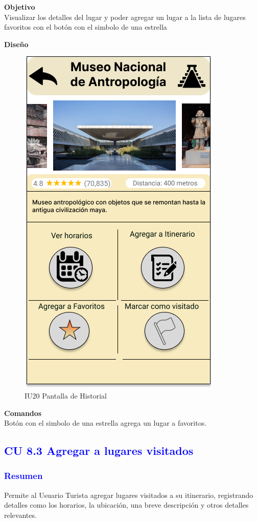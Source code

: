 \textbf{Objetivo} \\
Visualizar los detalles del lugar y poder agregar un lugar a la lista de lugares favoritos con el botón con el simbolo de una estrella

\textbf{Diseño}

    \begin{figure}[h]
        
            \centering
            \includegraphics[width=.4\linewidth]{Pantallas Prototipo3/IU41-Detalles del lugar.jpg}
            \caption{IU20 Pantalla de Historial}
    
    \end{figure}
\pagebreak
\textbf{Comandos} \\
Botón con el simbolo de una estrella agrega un lugar a favoritos.


\vspace{20cm}
\subsection{\textcolor{blue}{CU 8.3 Agregar a lugares visitados}}
\subsubsection{\textcolor{blue}{Resumen}}
Permite al Usuario Turista agregar lugares visitados a su itinerario, registrando detalles como los horarios, la ubicación, una breve descripción y otros detalles relevantes.

